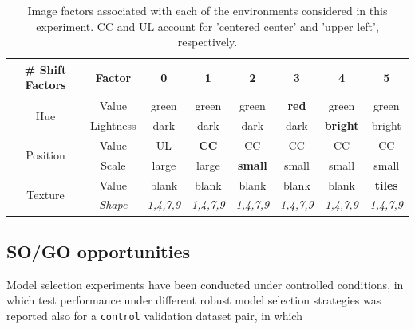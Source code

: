 \begin{table}[H]
    \centering
    \begin{tabular}{c|c|c|c|c|c|c|c}
        \# Shift Factors & Factor & 0 & 1 & 2 & 3 & 4 & 5 \\
        \midrule
        \multirow{2}{*}{Hue} 
        & Value & green & green & green & \textbf{red} & green & green \\
        & Lightness & dark & dark & dark & dark & \textbf{bright} & bright \\
        \midrule
        \multirow{2}{*}{Position} 
        & Value & UL & \textbf{CC} & CC & CC & CC & CC \\
        & Scale & large & large & \textbf{small} & small & small & small \\
        \midrule
        \multirow{2}{*}{Texture} 
        & Value & blank & blank & blank & blank & blank & \textbf{tiles} \\
        & \textit{Shape} & \textit{1,4,7,9} & \textit{1,4,7,9} & \textit{1,4,7,9} & \textit{1,4,7,9} & \textit{1,4,7,9} & \textit{1,4,7,9} \\
        \bottomrule
    \end{tabular}
    \caption{
    Image factors associated with each of the environments considered in this experiment. CC and UL account
    for 'centered center' and 'upper left', respectively.
    }
    \label{ds:pos_test}
\end{table}


\subsection{SO/GO opportunities}

Model selection experiments have been conducted under controlled conditions, in which test performance
under different robust model selection strategies was reported also for a \texttt{control} validation
dataset pair, in which 

